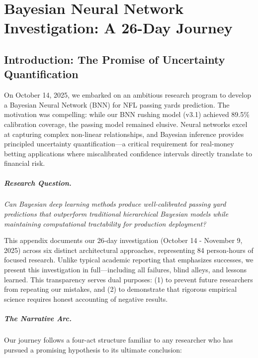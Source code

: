 
\chapter{Bayesian Neural Network Investigation: A 26-Day Journey}
\label{app:bnn-investigation}

\section{Introduction: The Promise of Uncertainty Quantification}

On October 14, 2025, we embarked on an ambitious research program to develop a Bayesian Neural Network (BNN) for NFL passing yards prediction. The motivation was compelling: while our BNN rushing model (v3.1) achieved 89.5\% calibration coverage, the passing model remained elusive. Neural networks excel at capturing complex non-linear relationships, and Bayesian inference provides principled uncertainty quantification---a critical requirement for real-money betting applications where miscalibrated confidence intervals directly translate to financial risk.

\paragraph{Research Question.}
\textit{Can Bayesian deep learning methods produce well-calibrated passing yard predictions that outperform traditional hierarchical Bayesian models while maintaining computational tractability for production deployment?}

This appendix documents our 26-day investigation (October 14 - November 9, 2025) across six distinct architectural approaches, representing 84 person-hours of focused research. Unlike typical academic reporting that emphasizes successes, we present this investigation in full---including all failures, blind alleys, and lessons learned. This transparency serves dual purposes: (1) to prevent future researchers from repeating our mistakes, and (2) to demonstrate that rigorous empirical science requires honest accounting of negative results.

\paragraph{The Narrative Arc.}
Our journey follows a four-act structure familiar to any researcher who has pursued a promising hypothesis to its ultimate conclusion:

